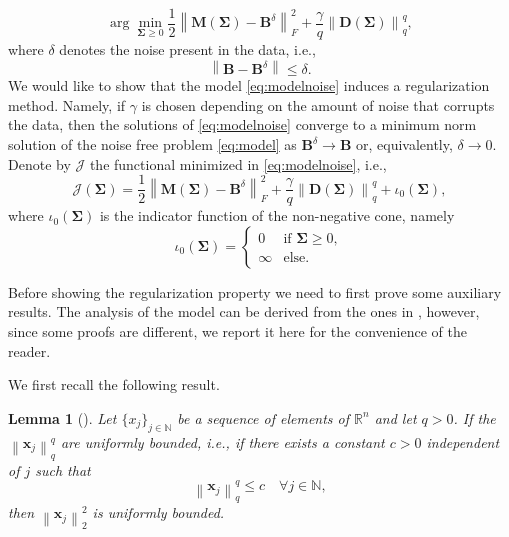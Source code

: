 \documentclass[final,leqno]{siamltex}
\newtheorem{lem}[theorem]{Lemma}
\newcommand{\R}{{\mathbb R}}
\newcommand{\N}{{\mathbb N}}
\newcommand{\norm}[1]{\left\| #1 \right\|}
\newcommand{\bm}[1]{\mathbf{#1}}
\newcommand{\Sigmab}{\mathbf{\Sigma}}
\begin{document}
\begin{equation}\label{eq:modelnoise}
\arg\min_{\Sigmab\geq0}\frac{1}{2}\norm{\mathbf{M}(\mathbf{\Sigma})-\mathbf{B}^\delta}_F^2+\frac{\gamma}{q}\norm{\mathbf{D}(\mathbf{\Sigma})}_q^q,
\end{equation}
where $\delta$ denotes the noise present in the data, i.e.,
$$
\norm{\bm{B}-\bm{B}^\delta}\leq\delta.
$$
We would like to show that the model \eqref{eq:modelnoise} induces a regularization method. Namely, if $\gamma$ is chosen depending on the amount of noise that corrupts the data, then the solutions of \eqref{eq:modelnoise} converge to a minimum norm solution of the noise free problem \eqref{eq:model} as $\mathbf{B}^\delta\rightarrow\mathbf{B}$ or, equivalently, $\delta\rightarrow0$. Denote by $\mathcal{J}$ the functional minimized in \eqref{eq:modelnoise}, i.e.,
\begin{equation}\label{eq:J}
\mathcal{J}(\mathbf{\Sigma})=\frac{1}{2}\norm{\mathbf{M}(\mathbf{\Sigma})-\mathbf{B}^\delta}_F^2+\frac{\gamma}{q}\norm{\mathbf{D}(\mathbf{\Sigma})}_q^q+\iota_0(\Sigmab),
\end{equation}
where $\iota_0(\Sigmab)$ is the indicator function of the non-negative cone, namely
$$
\iota_0(\Sigmab)=\left\{\begin{array}{ll}
0&\mbox{if }\Sigmab\geq0,\\
\infty&\mbox{else.}
\end{array}\right.
$$

Before showing the regularization property we need to first prove some auxiliary results. The analysis of the model can be derived from the ones in \cite{BPR20,HKP07}, however, since some proofs are different, we report it here for the convenience of the reader.

We first recall the following result.
\begin{lem}[\cite{BPR20}]\label{lemma:bound}
Let $\{x_j\}_{j\in\N}$ be a sequence of elements of $\R^n$ and let $q>0$. If the $\norm{\bm{x}_j}_q^q$ are uniformly bounded, i.e., if there exists a constant $c>0$ independent of $j$ such that
\begin{equation*}
\norm{\bm{x}_j}_q^q\leq c\quad \forall j\in\N,
\end{equation*}
then $\norm{\bm{x}_j}_2^2$ is uniformly bounded.
\end{lem}
\end{document}

